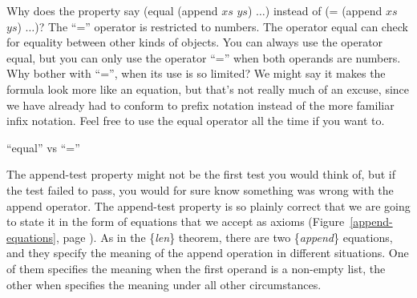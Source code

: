 \begin{aside}
Why does the property say \textsf{(equal (append $xs$ $ys$) $\dots$)}
instead of \textsf{(= (append $xs$ $ys$) $\dots$)}?
The ``\textsf{=}'' operator
is restricted to numbers. The operator \textsf{equal} can check
for equality between other kinds of objects.
You can always use the operator \textsf{equal},
but you can only use the operator ``\textsf{=}'' when both operands are numbers.
Why bother with ``\textsf{=}'', when its use is so limited?
We might say it makes the formula look more like an equation,
but that's not really much of an excuse,
since we have already had to conform to prefix notation
instead of the more familiar infix notation.
Feel free to use the \textsf{equal} operator all the time if you want to.
\caption{``\textsf{equal}'' vs ``\textsf{=}''}
\label{equal}
\end{aside}

The append-test property might not be the first test you would think of,
but if the test failed to pass,
you would for sure know something was wrong with the \textsf{append} operator.
The append-test property is so plainly correct that
we are going to state it in the form of equations that we accept as axioms
(Figure~\ref{append-equations}, page \pageref{append-equations}).
As in the \{\emph{len}\} theorem, there are two \{\emph{append}\} equations,
and they specify the meaning of the append operation in different situations.
One of them specifies the meaning when the first operand is a non-empty list,
the other when specifies the meaning under all other circumstances.

